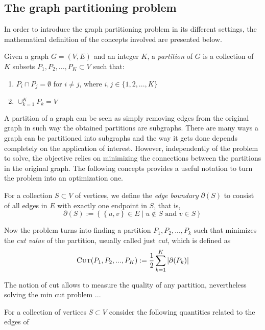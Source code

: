 \subsection{The graph partitioning problem}
In order to introduce the graph partitioning problem in its different settings, the mathematical definition of the concepts involved are presented below.
\begin{definition}
	Given a graph $G = (V, E)$ and an integer $K$, a \textit{partition} of $G$ is a collection of $K$ subsets $P_1, P_2, ..., P_K\subset V$ such that:
	\begin{enumerate}
		\item $P_i \cap P_j = \emptyset$ for $i\neq j$, where $i,j\in \{1,2,...,K\}$
		\item $\cup_{k=1}^K P_k = V$
	\end{enumerate}	 
\end{definition}
    A partition of a graph can be seen as simply removing edges from the original graph in such way the obtained partitions are subgraphs. There are many ways a graph can be partitioned into subgraphs and the way it gets done depends completely on the application of interest. However, independently of the problem to solve, the objective relies on minimizing the connections between the partitions in the original graph. The following concepts provides a useful notation to turn the problem into an optimization one.
    
	For a collection $S\subset V$ of vertices, we define the \textit{edge boundary} $\partial(S)$ to consist of all edges in $E$ with exactly one endpoint in $S$, that is,
	\begin{displaymath}
		\partial(S) := \left\{ \left\{u, v\right\}  \in E \mid u \notin S \text{ and } v\in S \right\}
	\end{displaymath}
	
	Now the problem turns into finding a partition $P_1, P_2, ..., P_k$ such that minimizes the \textit{cut value} of the partition, usually called just \textit{cut}, which is defined as
	\begin{equation}
	    \label{mincut}
	    \textsc{Cut}(P_1, P_2, ..., P_K) := \frac{1}{2} \sum_{k=1}^K \left|\partial(P_k)\right|
	\end{equation}
	
	The notion of cut allows to measure the quality of any partition, nevertheless solving the min cut problem ...

	For a collection of vertices $S\subset V$ consider the following quantities related to the edges of 
	

